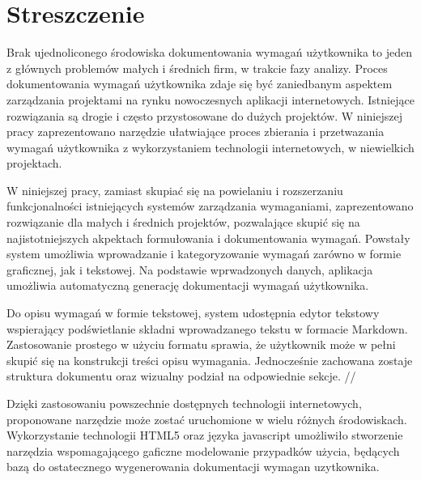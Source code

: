 \section{Streszczenie}

Brak ujednoliconego środowiska dokumentowania wymagań użytkownika to jeden z głównych problemów małych i średnich firm, w trakcie fazy analizy. Proces dokumentowania wymagań użytkownika zdaje się być zaniedbanym aspektem zarządzania projektami na rynku nowoczesnych aplikacji internetowych. Istniejące rozwiązania są drogie i często przystosowane do dużych projektów. W niniejszej pracy zaprezentowano narzędzie ułatwiające proces zbierania i przetwazania wymagań użytkownika z wykorzystaniem technologii internetowych, w niewielkich projektach. 

W niniejszej pracy, zamiast skupiać się na powielaniu i rozszerzaniu funkcjonalności istniejących systemów zarządzania wymaganiami, zaprezentowano rozwiązanie dla małych i średnich projektów, pozwalające skupić się na najistotniejszych akpektach formułowania  i dokumentowania wymagań. Powstały system umożliwia wprowadzanie i kategoryzowanie wymagań zarówno w formie graficznej, jak i tekstowej. Na podstawie wprwadzonych danych, aplikacja umożliwia automatyczną generację dokumentacji wymagań użytkownika. 

Do opisu wymagań w formie tekstowej, system udostępnia edytor tekstowy wspierający podświetlanie składni wprowadzanego tekstu w formacie Markdown. Zastosowanie prostego w użyciu formatu sprawia, że użytkownik może w pełni skupić się na konstrukcji treści opisu wymagania. Jednocześnie zachowana zostaje struktura dokumentu oraz wizualny podział na odpowiednie sekcje. // 

Dzięki zastosowaniu powszechnie dostępnych  technologii internetowych, proponowane narzędzie może zostać uruchomione w wielu różnych środowiskach. Wykorzystanie technologii  HTML5 oraz języka javascript umożliwiło stworzenie narzędzia wspomagającego gaficzne modelowanie przypadków użycia, będących bazą do ostatecznego wygenerowania dokumentacji wymagan uzytkownika. 
